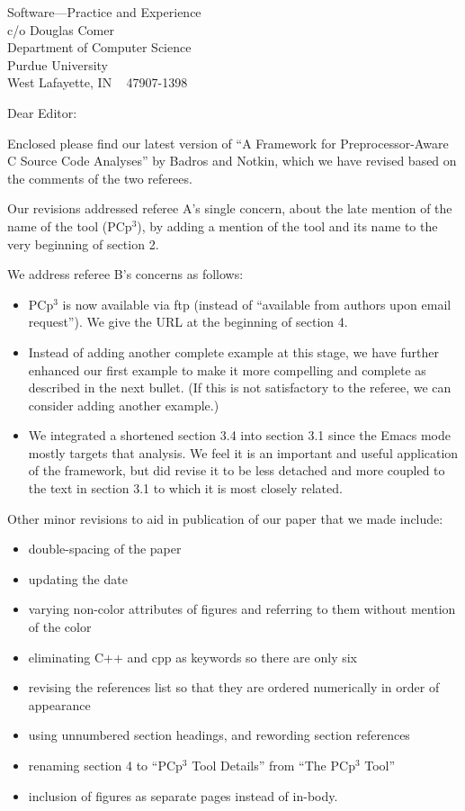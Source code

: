 \documentclass{letter}
\newcommand{\pcp}{\mbox{\textsf{PCp}$^3$}}
\begin{document}
\begin{letter}{
Software---Practice and Experience \\
c/o Douglas Comer \\
Department of Computer Science \\
Purdue University \\
West Lafayette, IN ~ 47907-1398}

\opening{Dear Editor:}

Enclosed please find our latest version of ``A Framework for
Preprocessor-Aware C Source Code Analyses'' by Badros and Notkin, which we
have revised based on the comments of the two referees.

Our revisions addressed referee A's single concern, about the late
mention of the name of the tool (\pcp{}), by adding a mention of the
tool and its name to the very beginning of section 2.

We address referee B's concerns as follows:

\begin{itemize}
\item \pcp{} is now available via ftp (instead of ``available from
      authors upon email request'').  We give the URL at the beginning
      of section 4.
\item Instead of adding another complete example at this stage, we have
      further enhanced our first example to make it more compelling and
      complete as described in the next bullet. (If this is not
      satisfactory to the referee, we can consider adding another
      example.)
\item We integrated a shortened section 3.4 into section 3.1 since the
      Emacs mode mostly targets that analysis.  We feel it is an
      important and useful application of the framework, but did revise
      it to be less detached and more coupled to the text in section 3.1 
      to which it is most closely related.
\end{itemize}

Other minor revisions to aid in publication of our paper that we made
include:

\begin{itemize}
\item double-spacing of the paper
\item updating the date
\item varying non-color attributes of figures and referring to them without
      mention of the color
\item eliminating C++ and cpp as keywords so there are only six
\item revising the references list so that they are ordered numerically
      in order of appearance
\item using unnumbered section headings, and rewording section references
\item renaming section 4 to ``\pcp{} Tool Details'' from ``The \pcp{}
      Tool''
\item inclusion of figures as separate pages instead of in-body.
\end{itemize}


\end{letter}
\end{document}
